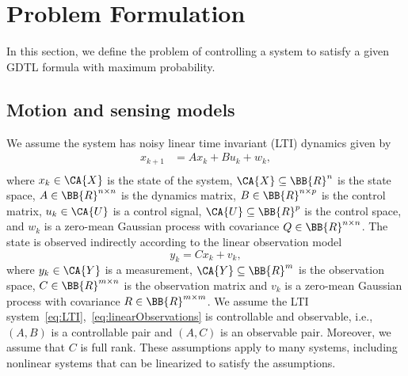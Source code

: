 \section{Problem Formulation}\label{sec:prob}
In this section, we define the problem of controlling a system to satisfy a given
GDTL formula with maximum probability.  

\subsection{Motion and sensing models}
\label{sec:motion}
We assume the system has noisy linear time invariant (LTI) dynamics given by
\begin{equation}
\label{eq:LTI}
\begin{aligned}
x_{k+1} &= A x_k +B u_k + w_k,\\
\end{aligned}
\end{equation}
%
where $x_k\in\CA{X}$ is the state of the system,
$\CA{X} \subseteq \BB{R}^n$ is the state space,
$A \in \BB{R}^{n \times n}$ is the dynamics matrix,
$B \in \BB{R}^{n \times p}$ is the control matrix,
$u_k \in \CA{U}$ is a control signal,
$\CA{U} \subseteq \BB{R}^p$ is the control space,
and $w_k$ is a zero-mean Gaussian process with covariance
$Q \in \BB{R}^{n \times n}$.
The state is observed indirectly 
according to the
linear observation model
\begin{equation}
\label{eq:linearObservations}
 y_k = C x_k + v_k,
\end{equation}
%
where $y_k \in \CA{Y}$ is a measurement, $\CA{Y} \subseteq \BB{R}^m$ is the observation space,
$C \in \BB{R}^{m \times n}$ is the observation matrix
and $v_k$ is a zero-mean Gaussian process with covariance
$R \in \BB{R}^{m \times m}$.
We assume the LTI system~\eqref{eq:LTI},~\eqref{eq:linearObservations}
is controllable and observable, i.e., $(A,B)$ is a controllable pair
and $(A,C)$ is an observable pair.
Moreover, we assume that $C$ is full rank.
These assumptions apply to many systems, including nonlinear systems that can be linearized to satisfy the assumptions.
 
